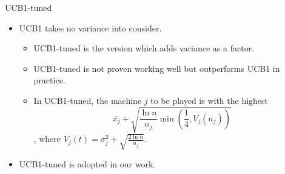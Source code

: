 \begin{frame}{UCB1-tuned}
  \begin{itemize}
    \item UCB1 takes no variance into consider.
      \begin{itemize}
        \item UCB1-tuned is the version which adds variance as a factor.
        \item UCB1-tuned is not proven working well but outperforms UCB1 in
          practice.
        \item In UCB1-tuned, the machine $j$ to be played is with the
          highest \[\bar{x_j} + \sqrt{\frac{\ln{n}}{n_j}
          \min(\frac{1}{4},V_j(n_j))}\], where $V_j(t) =\sigma_j^2 +
          \sqrt{\frac{2\ln n}{n_j}}$.
      \end{itemize}
      \vspace*{14pt}
    \item UCB1-tuned is adopted in our work.
  \end{itemize}

\end{frame}

